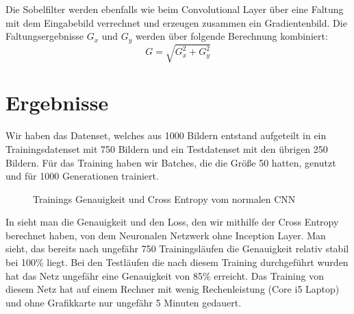 \documentclass[runningheads,a4paper]{llncs}[2015/06/24]
\begin{document}
Die Sobelfilter werden ebenfalls wie beim Convolutional Layer über eine Faltung mit dem Eingabebild verrechnet und erzeugen zusammen ein Gradientenbild. Die Faltungsergebnisse $G_x$ und $G_y$ werden über folgende Berechnung kombiniert: \[G = \sqrt{G_x^2+G_y^2}\]

    
\section{Ergebnisse}\label{sec:result}
Wir haben das Datenset, welches aus 1000 Bildern entstand aufgeteilt in ein Trainingsdatenset mit 750 Bildern und ein Testdatenset mit den übrigen 250 Bildern. Für das Training haben wir Batches, die die  Größe 50 hatten, genutzt und für 1000 Generationen trainiert.
\begin{figure}
	\caption{Trainings Genauigkeit und Cross Entropy vom normalen CNN}
	\label{fig:conv_result_graph}
\end{figure}
In  sieht man die Genauigkeit und den Loss, den wir mithilfe der Cross Entropy berechnet haben, von dem Neuronalen Netzwerk ohne Inception Layer. Man sieht, das bereits nach ungefähr 750 Trainingsläufen die Genauigkeit relativ stabil bei 100\% liegt. Bei den Testläufen die nach diesem Training durchgeführt wurden hat das Netz ungefähr eine Genauigkeit von 85\% erreicht. Das Training von diesem Netz hat auf einem Rechner mit wenig Rechenleistung (Core i5 Laptop) und ohne Grafikkarte nur ungefähr 5 Minuten gedauert.\\
\end{document}
